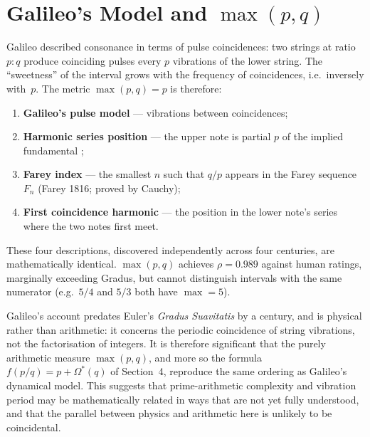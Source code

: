 \documentclass[11pt,a4paper]{article}
\newcommand{\Os}{\Omega^{\!*}}
\begin{document}

\section{Galileo's Model and \texorpdfstring{$\max(p,q)$}{max(p,q)}}

Galileo \cite{galilei1638, barbieri2001} described consonance in terms of pulse coincidences: two strings
at ratio $p:q$ produce coinciding pulses every $p$ vibrations of the lower
string. The ``sweetness'' of the interval grows with the frequency of
coincidences, i.e.\ inversely with~$p$. The metric $\max(p,q) = p$ is
therefore:

\begin{enumerate}
  \item \textbf{Galileo's pulse model} --- vibrations between coincidences;
  \item \textbf{Harmonic series position} --- the upper note is partial $p$ of
        the implied fundamental \cite{rameau1722};
  \item \textbf{Farey index} --- the smallest $n$ such that $q/p$ appears in
        the Farey sequence $F_n$ (Farey 1816; proved by Cauchy);
  \item \textbf{First coincidence harmonic} --- the position in the lower
        note's series where the two notes first meet.
\end{enumerate}

These four descriptions, discovered independently across four centuries, are
mathematically identical. $\max(p,q)$ achieves $\rho = 0.989$ against human
ratings, marginally exceeding Gradus, but cannot distinguish intervals with
the same numerator (e.g.\ $5/4$ and $5/3$ both have $\max = 5$).

Galileo's account predates Euler's \emph{Gradus Suavitatis} by a century, and
is physical rather than arithmetic: it concerns the periodic coincidence of
string vibrations, not the factorisation of integers. It is therefore
significant that the purely arithmetic measure $\max(p,q)$, and more so the
formula $f(p/q) = p + \Os(q)$ of Section~4, reproduce the same ordering as
Galileo's dynamical model. This suggests that prime-arithmetic complexity and
vibration period may be mathematically related in ways that are not yet fully
understood, and that the parallel between physics and arithmetic here is
unlikely to be coincidental.

\end{document}
